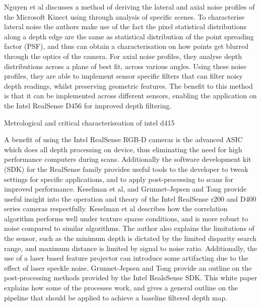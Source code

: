  
 Nguyen et al \cite{nguyenModelingKinectSensor2012} discusses a method of deriving the lateral and axial noise profiles of the Microsoft Kinect using through analysis of specific scenes. To characterise lateral noise the authors make use of the fact the pixel statistical distributions along a depth edge are the same as statistical distribution of the point spreading factor (PSF), and thus can obtain a characterisation on how points get blurred through the optics of the camera. For axial noise profiles, they analyse depth distributions across a plane of best fit, across various angles. Using these noise profiles, they are able to implement sensor specific filters that can filter noisy depth readings, whilst preserving geometric features. The benefit to this method is that it can be implemented across different sensors, enabling the application on the Intel RealSense D456 for improved depth filtering.
 
 Metrological and critical characteriseation of intel d415 
 
A benefit of using the Intel RealSense RGB-D cameras is the advanced ASIC which does all depth processing on device, thus eliminating the need for high performance computers during scans. Additionally the software development kit (SDK) for the RealSense family provides useful tools to the developer to tweak settings for specific applications, and to apply post-processing to scans for improved performance. Keselman et al, and Grunnet-Jepsen and Tong \cite{keselmanIntelRRealSenseTMStereoscopic2017,DepthPostProcessingIntel} provide useful insight into the operation and theory of the Intel RealSense r200 and D400 series cameras respectfully. Keselman et al \cite{keselmanIntelRRealSenseTMStereoscopic2017} describes how the correlation algorithm performs well under texture sparse conditions, and is more robust to noise compared to similar algorithms. The author also explains the limitations of the sensor, such as the minimum depth is dictated by the limited disparity search range, and maximum distance is limited by signal to noise ratio. Additionally, the use of a laser based feature projector can introduce some artifacting due to the effect of laser speckle noise. Grunnet-Jepsen and Tong \cite{DepthPostProcessingIntel} provide an outline on the post-processing methods provided by the Intel RealsSense SDK. This white paper explains how some of the processes work, and gives a general outline on the pipeline that should be applied to achieve a baseline filtered depth map.
 
